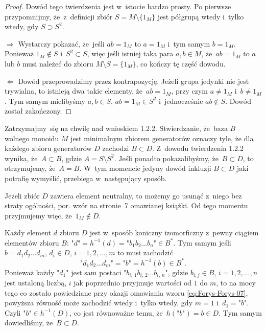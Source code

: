 \documentclass[a4paper,11pt]{article}
\begin{document}
\begin{proof}

  Dowód tego twierdzenia jest w~istocie bardzo prosty. Po pierwsze
  przypomnijmy, że~z~definicji zbiór $S = M \setminus \{ 1_{ M } \}$ jest półgrupą
  wtedy i~tylko wtedy, gdy $S \supset S^{ 2 }$.

  $\Rightarrow$ Wystarczy pokazać, że~jeśli $a b = 1_{ M }$ to $a = 1_{ M }$ i~tym
  samym $b = 1_{ M }$. Ponieważ $1_{ M } \notin S$ i~$S^{ 2 } \subset S$, więc jeśli
  istniej taka para $a, b \in M$, że~$ab = 1_{ M }$ to $a$ lub $b$ musi
  należeć do zbioru $M \setminus S = \{ 1_{ M } \}$, co kończy tę część dowodu.

  $\Leftarrow$ Dowód przeprowadzimy przez kontrapozycję. Jeżeli grupa jedynki nie
  jest trywialna, to istnieją dwa takie elementy, że~$a b = 1_{ M }$, przy
  czym $a \neq 1_{ M }$ i~$b \neq 1_{ M }$. Tym samym mielibyśmy $a, b \in S$,
  $ab = 1_{ M } \in S^{ 2 }$ i~jednocześnie $ab \notin S$. Dowód został zakończony.

\end{proof}





\start {} Zatrzymajmy~się na chwilę nad wnioskiem 1.2.2.
Stwierdzanie, że~baza $B$ wolnego monoidu $M$ jest minimalnym zbiorem
generatorów oznaczy tyle, że dla każdego zbioru generatorów $D$ zachodzi
$B \subset D$. Z~dowodu twierdzenia 1.2.2 wynika, że~$A \subset B$, gdzie
$A = S \setminus S^{ 2 }$. Jeśli ponadto pokazalibyśmy, że~$B \subset D$, to otrzymujemy,
że~$A = B$. W~tym momencie jedyny dowód inkluzji $B \subset D$ jaki potrafię
wymyślić, przebiega w~następujący sposób.

Jeżeli zbiór $D$ zawiera element neutralny, to możemy go usunąć z~niego bez
straty ogólności, por. wzór na stronie~7 omawianej książki. Od tego momentu
przyjmujemy więc, że~$1_{ M } \notin D$.

Każdy element $d$ zbioru $D$ jest w~sposób koniczny izomorficzny z~pewny
ciągiem elementów zbioru $B$:
$\texttt{"} d \texttt{"} = h^{ -1 }( d ) = \texttt{"} b_{ 1 } b_{ 2 } \ldots b_{ n }
\texttt{"} \in B^{ * }$. Tym samym jeśli $b = d_{ 1 } d_{ 2 } \ldots d_{ m }$,
$d_{ i } \in D$, $i = 1, 2, \ldots, m$ to musi zachodzić
\begin{equation}
  \label{eq:Forys-Forys-28}
  \texttt{"} d_{ 1 } d_{ 2 } \ldots d_{ m } \texttt{"} =
  \texttt{"} b \texttt{"} = h^{ -1 }( b ) \in B^{ * }.
\end{equation}
Ponieważ każdy $\texttt{"} d_{ 1 } \texttt{"}$ jest sam postaci
$\texttt{"} b_{ i,\, 1 } b_{ i,\, 2 } \ldots b_{ i,\, n } \texttt{"}$, gdzie
$b_{ i, j } \in B$, $i = 1, 2, \ldots, n$ jest ustaloną liczbą, $i$ jak poprzednio
przyjmuje wartości od $1$ do $m$, to na mocy tego co zostało powiedziane
przy okazji omawiania wzoru \eqref{eq:Forys-Forys-07}, powyższa równość
może zachodzić wtedy i~tylko wtedy, gdy $m = 1$ i~$d_{ 1 } = \texttt{"} b
\texttt{"}$. Czyli $\texttt{"} b \texttt{"} \in h^{ -1 }( D )$, co jest
równoważne temu, że~$h( \texttt{"} b \texttt{"} ) = b \in D$. Tym samym
dowiedliśmy, że~$B \subset D$.
\end{document}
